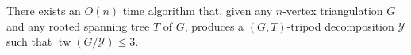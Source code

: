 \documentclass{patmorin}
\DeclareMathOperator{\tw}{tw}
\DeclareMathOperator{\lca}{lca}
\begin{document}
%
%



\begin{thm}\label{three_tree_algorithm}
  There exists an $O(n)$ time algorithm that, given any $n$-vertex triangulation $G$ and any rooted spanning tree $T$ of $G$, produces a $(G,T)$-tripod decomposition $\mathcal{Y}$ such that $\tw(G/\mathcal{Y})\le 3$.
\end{thm}
\end{document}
